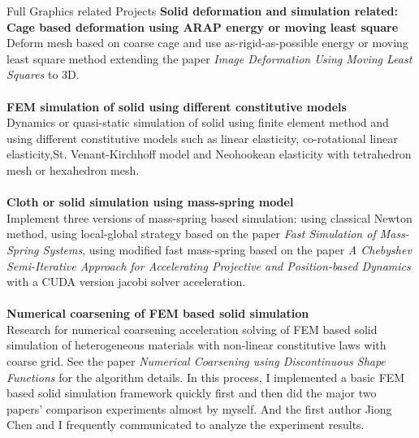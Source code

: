 \documentclass{resume} %
\begin{document}
\begin{rSection}{Full Graphics related Projects}
  \textbf{Solid deformation and simulation related:}\\
         {\bf Cage based deformation using ARAP energy or moving least square}\\Deform mesh based on coarse cage and use as-rigid-as-possible energy or moving least square method extending the paper \emph{Image Deformation Using Moving Least Squares} to 3D.\\
         \\{\bf FEM simulation of solid using different constitutive models}\\Dynamics or quasi-static simulation of solid using finite element method and using different constitutive models such as linear elasticity, co-rotational  linear elasticity,St. Venant-Kirchhoff model and Neohookean elasticity with tetrahedron mesh or hexahedron mesh. \\
         \\{\bf Cloth or solid simulation using mass-spring model}\\Implement three versions of mass-spring based simulation: using classical Newton method, using local-global strategy based on the paper \textit{Fast Simulation of Mass-Spring Systems}, using modified fast mass-spring based on the paper \textit{A Chebyshev Semi-Iterative Approach for Accelerating Projective and Position-based Dynamics} with a CUDA version jacobi solver acceleration.\\
         \\{\bf Numerical coarsening of FEM based solid simulation}\\ Research for numerical coarsening acceleration solving of FEM based solid simulation of heterogeneous materials with non-linear constitutive laws with coarse grid. See the paper \emph{Numerical Coarsening using Discontinuous Shape Functions} for the algorithm details. In this process, I implemented a basic FEM based solid simulation framework quickly first and then did the major two papers' comparison experiments almost by myself. And the first author Jiong Chen and I frequently communicated to analyze the experiment results. 


\end{rSection}
\end{document}
